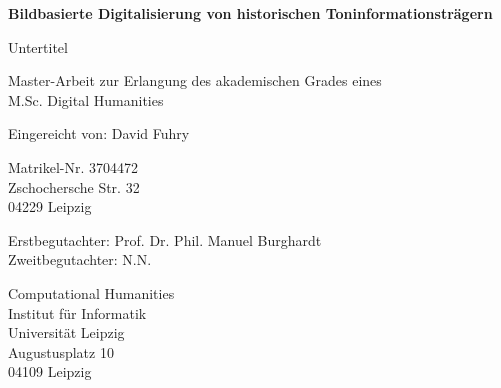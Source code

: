 \documentclass[a4paper, monochrome]{article}
\begin{document}
\begin{titlepage}
    \begin{center}
        \vspace*{1cm}

        \textbf{\Large Bildbasierte Digitalisierung von historischen Toninformationsträgern}

        \vspace{0.5cm}
        Untertitel
                
        \vspace{1.5cm}


        \vfill
                
        Master-Arbeit zur Erlangung des akademischen Grades eines\\
        M.Sc. Digital Humanities

        \vspace{3cm}
                
        Eingereicht von: David Fuhry
        
        \vspace{0.2cm}

        Matrikel-Nr. 3704472\\
        Zschochersche Str. 32\\
        04229 Leipzig

        \vspace{1cm}

        Erstbegutachter: Prof. Dr. Phil. Manuel Burghardt \\
        Zweitbegutachter: N.N.
        
        \vspace{0.2cm}
                    
        Computational Humanities\\
        Institut für Informatik\\
        Universität Leipzig\\
        Augustusplatz 10\\
        04109 Leipzig 
                
    \end{center}
\end{titlepage}

\tableofcontents

\thispagestyle{empty}

\newpage




\end{document}
